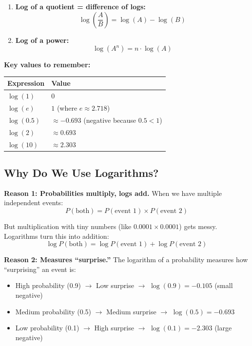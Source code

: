 \begin{chapterenv}
\begin{infobox}
\begin{enumerate}[nosep]
    \item \textbf{Log of a quotient = difference of logs:}
    \[\log\left(\frac{A}{B}\right) = \log(A) - \log(B)\]

    \item \textbf{Log of a power:}
    \[\log(A^n) = n \cdot \log(A)\]
\end{enumerate}

\textbf{Key values to remember:}

\begin{center}
\begin{tabular}{ll}
\toprule
\textbf{Expression} & \textbf{Value} \\
\midrule
$\log(1)$ & $0$ \\
$\log(e)$ & $1$ (where $e \approx 2.718$) \\
$\log(0.5)$ & $\approx -0.693$ (negative because $0.5 < 1$) \\
$\log(2)$ & $\approx 0.693$ \\
$\log(10)$ & $\approx 2.303$ \\
\bottomrule
\end{tabular}
\end{center}
\end{infobox}

\subsection{Why Do We Use Logarithms?}

\textbf{Reason 1: Probabilities multiply, logs add.} When we have multiple independent events:
\[P(\text{both}) = P(\text{event 1}) \times P(\text{event 2})\]

But multiplication with tiny numbers (like $0.0001 \times 0.0001$) gets messy. Logarithms turn this into addition:
\[\log P(\text{both}) = \log P(\text{event 1}) + \log P(\text{event 2})\]

\textbf{Reason 2: Measures ``surprise.''} The logarithm of a probability measures how ``surprising'' an event is:

\begin{itemize}[nosep]
    \item High probability (0.9) $\to$ Low surprise $\to$ $\log(0.9) = -0.105$ (small negative)
    \item Medium probability (0.5) $\to$ Medium surprise $\to$ $\log(0.5) = -0.693$
    \item Low probability (0.1) $\to$ High surprise $\to$ $\log(0.1) = -2.303$ (large negative)
\end{itemize}


\end{chapterenv}
